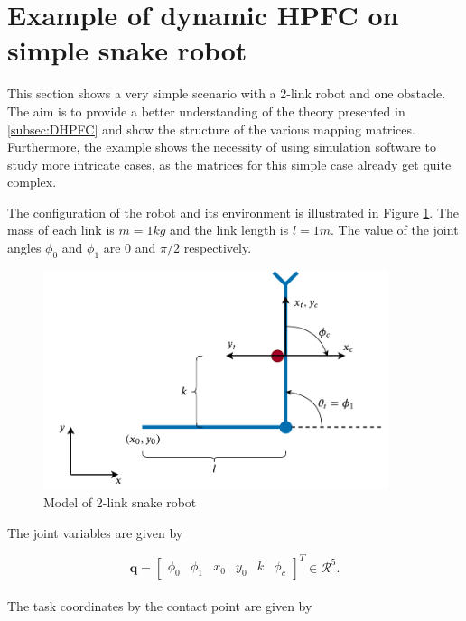 
\section{Example of dynamic HPFC on simple snake robot}

This section shows a very simple scenario with a 2-link robot and one obstacle. The aim is to provide a better understanding of the theory presented in \ref{subsec:DHPFC} and show the structure of the various mapping matrices.
Furthermore, the example shows the necessity of using simulation software to study more intricate cases, as the matrices for this simple case already get quite complex.

The configuration of the robot and its environment is illustrated in Figure \ref{fig:ex_2link}. %
The mass of each link is $m = 1 kg$ and the link length is $l=1 m$. The value of the joint angles $\phi_0$ and $\phi_1$ are $0$ and $\pi/2$ respectively.

\begin{figure}
    \centering
    \includegraphics[width=0.9\textwidth]{figures/theory/example_2link.pdf}
    \caption{Model of 2-link snake robot}
    \label{fig:ex_2link}
\end{figure}

The joint variables are given by

\begin{equation}
    \mathbf{q} =
    \begin{bmatrix}
        \phi_0 & \phi_1 & x_0 & y_0 & k & \phi_c
    \end{bmatrix}^T \in \mathcal{R}^5.
\end{equation}
\\
The task coordinates by the contact point are given by

